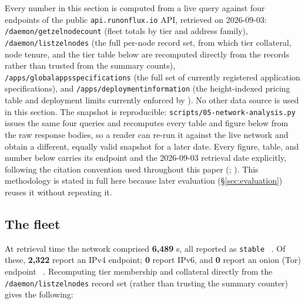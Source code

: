 Every number in this section is computed from a live query against four endpoints of the public
\texttt{api.\allowbreak{}runonflux.\allowbreak{}io} API, retrieved on 2026-09-03:
\texttt{/\allowbreak{}daemon/\allowbreak{}getzelnodecount} (fleet totals by tier and address family),
\texttt{/\allowbreak{}daemon/\allowbreak{}listzelnodes} (the full per-node record set, from which tier collateral, node
tenure, and the tier table below are recomputed directly from the records rather than trusted from
the summary counts), \texttt{/\allowbreak{}apps/\allowbreak{}globalappsspecifications} (the full set of currently registered
application specifications), and \texttt{/\allowbreak{}apps/\allowbreak{}deploymentinformation} (the height-indexed pricing
table and deployment limits currently enforced by \FluxOS). No other data source is used in this
section. The snapshot is reproducible: \texttt{scripts/\allowbreak{}05-network-analysis.\allowbreak{}py} issues the same four
queries and recomputes every table and figure below from the raw response bodies, so a reader can
re-run it against the live network and obtain a different, equally valid snapshot for a later date.
Every figure, table, and number below carries its endpoint and the 2026-09-03 retrieval date
explicitly, following the citation convention used throughout this paper
(\shipped; ). This methodology is stated in full here
because later evaluation (\S\ref{sec:evaluation}) reuses it without repeating it.

\subsection{The fleet}
\label{sec:deployed-today-fleet}

At retrieval time the network comprised \textbf{6,489} \FluxNode{}s, all reported as
\texttt{stable} \shipped\ . Of
these, \textbf{2,322} report an IPv4 endpoint; \textbf{0} report IPv6, and \textbf{0} report an
onion (Tor) endpoint \shipped\ .
Recomputing tier membership and collateral directly from the \texttt{/\allowbreak{}daemon/\allowbreak{}listzelnodes} record
set (rather than trusting the summary counter) gives the following:

